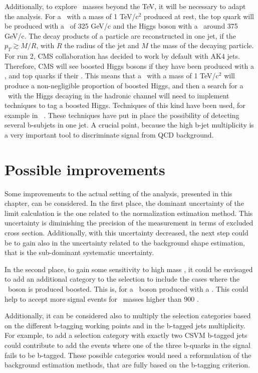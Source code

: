 Additionally, to explore \Tp~masses beyond the TeV, it will be necessary to adapt the analysis. For a \Tp~with a mass of 1 TeV/$\text{c}^{2}$ produced at rest, the top quark will be produced with a \pt~of 325 GeV/c and the Higgs boson with a \pt~around 375 GeV/c. The decay products of a particle are reconstructed in one jet, if the $p_{T}\gtrsim M/R$, with $R$ the radius of the jet and $M$ the mass of the decaying particle. For run 2, CMS collaboration has decided to work by default with AK4 jets. Therefore, CMS will see boosted Higgs bosons if they have been produced with a , and top quarks if their . This means that a \Tp~with a mass of 1 TeV/$\text{c}^{2}$ will produce a non-negligible proportion of boosted Higgs, and then a search for a \Tp~with the Higgs decaying in the hadronic channel will need to implement techniques to tag a boosted Higgs. Techniques of this kind have been used, for example in~ \cite{Khachatryan:2015axa}. These techniques have put in place the possibility of detecting several b-subjets in one jet. A crucial point, because the high b-jet multiplicity is a very important tool to discriminate signal from QCD background.

\section{Possible improvements}
\label{sec:impro}

Some improvements to the actual setting of the analysis, presented in this chapter, can be considered. In the first place, the dominant uncertainty of the limit calculation is the one related to the normalization estimation method. This uncertainty is diminishing the precision of the measurement in terms of excluded cross section. Additionally, with this uncertainty decreased, the next step could be to gain also in the uncertainty related to the background shape estimation, that is the sub-dominant systematic uncertainty.

In the second place, to gain some sensitivity to high mass \Tp, it could be envisaged to add an additional category to the selection to include the cases where the \W~boson is produced boosted. This is, for a \W~boson produced with a . This could help to accept more signal events for \Tp~masses higher than 900 \GeVcc.

Additionally, it can be considered also to multiply the selection categories based on the different b-tagging working points and in the b-tagged jets multiplicity. For example, to add a selection category with exactly two CSVM b-tagged jets could contribute to add the events where one of the three b-quarks in the signal fails to be b-tagged. These possible categories would need a reformulation of the background estimation methods, that are fully based on the b-tagging criterion.

